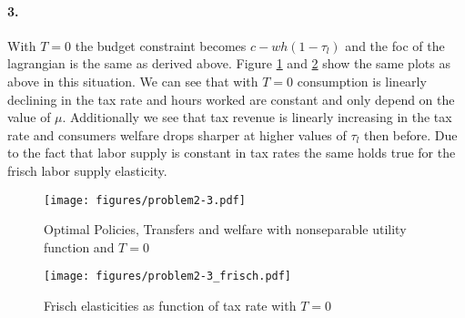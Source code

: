 \paragraph{3.}
With $T = 0$ the budget constraint becomes $c - w h \left(1 - \tau_l\right)$ and the foc of the lagrangian is the same as derived above. Figure \ref{fig:problem2-3} and \ref{fig:problem2-3_frisch} show the same plots as above in this situation. We can see that with $T = 0$ consumption is linearly declining in the tax rate and hours worked are constant and only depend on the value of $\mu$. Additionally we see that tax revenue is linearly increasing in the tax rate and consumers welfare drops sharper at higher values of $\tau_l$ then before. Due to the fact that labor supply is constant in tax rates the same holds true for the frisch labor supply elasticity.
\begin{figure}[h]
	\centering
			\texttt{[image: figures/problem2-3.pdf]}
	\caption{Optimal Policies, Transfers and welfare with nonseparable utility function and $T = 0$}
	\label{fig:problem2-3}
\end{figure}

\begin{figure}[h]
	\centering
			\texttt{[image: figures/problem2-3\_frisch.pdf]}
	\caption{Frisch elasticities as function of tax rate with $T = 0$}
	\label{fig:problem2-3_frisch}
\end{figure}
